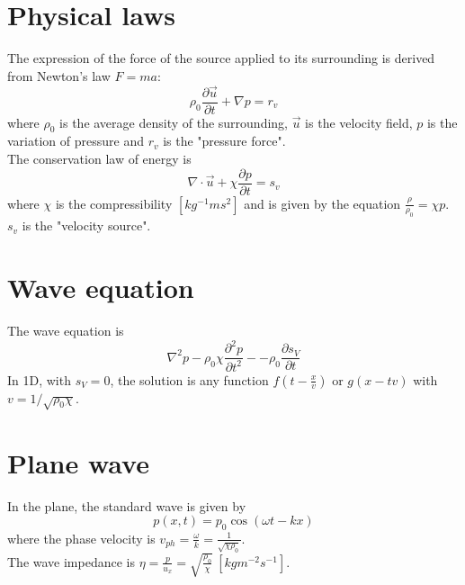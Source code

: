 \documentclass[12pt, openany]{report}
\theoremstyle{definition}
\begin{document}
\section{Physical laws}
The expression of the force of the source applied to its surrounding is derived from Newton's law $F=ma$:
\begin{equation}
  \rho_0 \frac{\partial \vec{u}}{\partial t} + \nabla p = r_v
\end{equation}
where $\rho_0$ is the average density of the surrounding, $\vec{u}$ is the velocity field, $p$ is the variation of pressure and $r_v$ is the "pressure force". \\
The conservation law of energy is 
\begin{equation}
  \nabla \cdot \vec{u} + \chi \frac{\partial p}{\partial t}=s_v
\end{equation}
where $\chi$ is the compressibility $[kg^{-1}ms^2]$ and is given by the equation $\frac{\rho}{\rho_0}=\chi p$. $s_v$ is the "velocity source".\\
\section{Wave equation}
The wave equation is
\begin{equation}
	\nabla^2p-\rho_0\chi \frac{\partial^2 p}{\partial t^2} - -\rho_0 \frac{\partial s_V}{\partial t}
\end{equation}
In 1D, with $s_V=0$, the solution is any function $f\left(t-\frac{x}{v}\right)$ or $g\left(x-tv\right)$ with $v=1/\sqrt{\rho_0\chi}$. 
\section{Plane wave}
In the plane, the standard wave is given by 
\begin{equation}
	p(x,t)=p_0 \cos(\omega t-kx)
\end{equation}
where the phase velocity is $v_{ph} = \frac{\omega}{k}=\frac{1}{\sqrt{\chi \rho_0}}$.\\
The wave impedance is $\eta = \frac{p}{u_x} = \sqrt{\frac{\rho_0}{\chi}} \ [kgm^{-2}s^{-1}]$.
\end{document}
